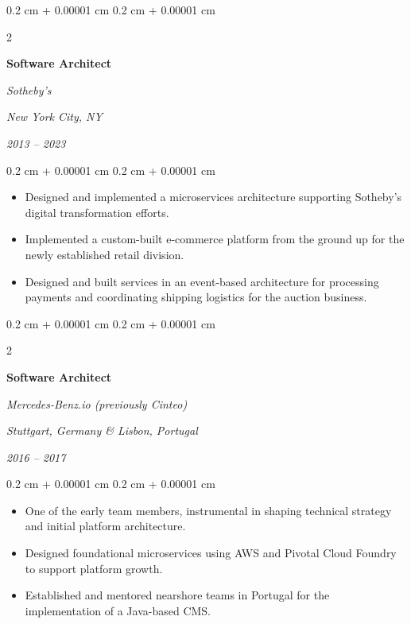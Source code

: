 \documentclass[10pt, a4paper]{article}
\newenvironment{highlights}{
    \begin{itemize}[
        topsep=0.10 cm,
        parsep=0.10 cm,
        partopsep=0pt,
        itemsep=0pt,
        leftmargin=0.4 cm + 10pt
    ]
}{
    \end{itemize}
} %
\newenvironment{onecolentry}{
    \begin{adjustwidth}{
        0.2 cm + 0.00001 cm
    }{
        0.2 cm + 0.00001 cm
    }
}{
    \end{adjustwidth}
} %
\newenvironment{twocolentry}[2][6cm]{ %
    \onecolentry
    \def\secondColumn{#2}
    \setcolumnwidth{\fill, #1} %
    \begin{paracol}{2}
}{
    \switchcolumn \raggedleft \secondColumn
    \end{paracol}
    \endonecolentry
} %
\begin{document}
\vspace{0.2 cm}

%
%
\begin{twocolentry}{
        \textit{New York City, NY}

        \textit{2013 – 2023}}
    \textbf{Software Architect}

    \textit{Sotheby's}
\end{twocolentry}

\vspace{0.10 cm}
\begin{onecolentry}
    \begin{highlights}
        \item Designed and implemented a microservices architecture supporting Sotheby's digital transformation efforts.
        \item Implemented a custom-built e-commerce platform from the ground up for the newly established retail division.
        \item Designed and built services in an event-based architecture for processing payments and coordinating shipping logistics for the auction business.
    \end{highlights}
\end{onecolentry}

\vspace{0.2 cm}

%
%
\begin{twocolentry}[7.5cm]{ %
        \textit{Stuttgart, Germany \& Lisbon, Portugal}

        \textit{2016 – 2017}}
    \textbf{Software Architect}

    \textit{Mercedes-Benz.io (previously Cinteo)}
\end{twocolentry}

\vspace{0.10 cm}
\begin{onecolentry}
    \begin{highlights}
        \item One of the early team members, instrumental in shaping technical strategy and initial platform architecture.
        \item Designed foundational microservices using AWS and Pivotal Cloud Foundry to support platform growth.
        \item Established and mentored nearshore teams in Portugal for the implementation of a Java-based CMS.
    \end{highlights}
\end{onecolentry}
\end{document}
